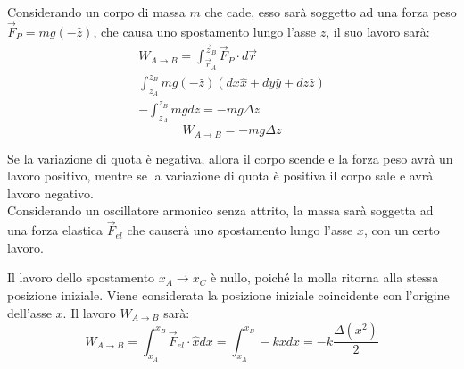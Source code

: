 \documentclass{article}
\numberwithin{equation}{subsection}
\begin{document}
Considerando un corpo di massa $m$ che cade, esso sarà soggetto 
ad una forza peso $\vec{F}_P=mg(-\hat{z})$, che causa uno spostamento 
lungo l'asse $z$, il suo lavoro sarà:
\begin{gather*}
    W_{A\to B}=\displaystyle\int_{\vec{r}_A}^{\vec{z}_B}\vec{F}_P\cdot d\vec{r}\\
    \displaystyle\int_{z_A}^{z_B}mg(-\hat{z})(dx\hat{x}+dy\hat{y}+dz\hat{z})\\
    \displaystyle-\int_{z_A}^{z_B}mgdz=-mg\Delta z
\end{gather*}
\begin{equation}
    W_{A\to B}=-mg\Delta z
\end{equation}
\begin{center}\end{center}



Se la variazione di quota è negativa, allora il corpo 
scende e la forza peso avrà un lavoro positivo, mentre 
se la variazione di quota è positiva il corpo sale e avrà 
lavoro negativo.
\\
Considerando un oscillatore armonico senza attrito, la massa 
sarà soggetta ad una forza elastica $\vec{F}_{el}$ che causerà uno 
spostamento lungo l'asse $x$, con un certo lavoro.
\begin{center}\end{center} 
Il lavoro dello spostamento $x_A\to x_C$ è nullo, poiché la molla 
ritorna alla stessa posizione iniziale. Viene considerata la posizione 
iniziale coincidente con l'origine dell'asse $x$. 
Il lavoro $W_{A\to B}$ sarà:
\begin{equation}
    W_{A\to B}=\displaystyle\int_{x_A}^{x_B}\vec{F}_{el}\cdot\hat{x}dx=\int_{x_A}^{x_B}-kxdx=-k\frac{\Delta( x^{2})}{2}
\end{equation}
\end{document}
